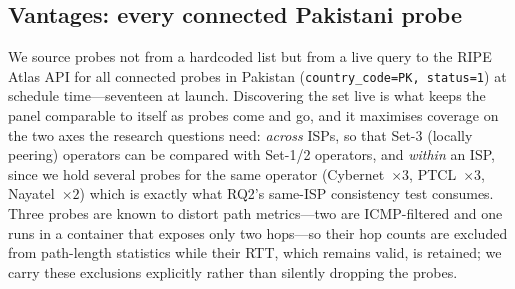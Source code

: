\documentclass[conference]{IEEEtran}
\begin{document}
\subsection{Vantages: every connected Pakistani probe}
We source probes not from a hardcoded list but from a live query to the RIPE Atlas API for all
connected probes in Pakistan (\texttt{country\_code=PK, status=1}) at schedule time---seventeen at
launch. Discovering the set live is what keeps the panel comparable to itself as probes come and go,
and it maximises coverage on the two axes the research questions need: \emph{across} ISPs, so that
Set-3 (locally peering) operators can be compared with Set-1/2 operators, and \emph{within} an ISP,
since we hold several probes for the same operator (Cybernet~$\times3$, PTCL~$\times3$,
Nayatel~$\times2$) which is exactly what RQ2's same-ISP consistency test consumes. Three probes are
known to distort path metrics---two are ICMP-filtered and one runs in a container that exposes only
two hops---so their hop counts are excluded from path-length statistics while their RTT, which
remains valid, is retained; we carry these exclusions explicitly rather than silently dropping the
probes.
\end{document}
